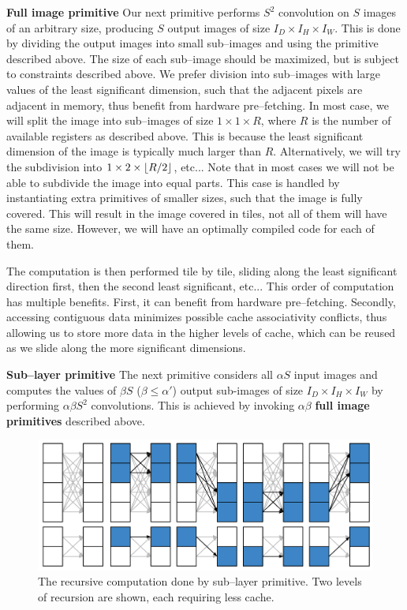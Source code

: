   {\bf Full image primitive} \quad Our next primitive performs $S^2$
  convolution on $S$ images of an arbitrary size, producing $S$ output
  images of size $I_D \times I_H \times I_W$.  This is done by
  dividing the output images into small sub--images and using the
  primitive described above.  The size of each sub--image should be
  maximized, but is subject to constraints described above.  We prefer
  division into sub--images with large values of the least significant
  dimension, such that the adjacent pixels are adjacent in memory,
  thus benefit from hardware pre--fetching.  In most case, we will
  split the image into sub--images of size $1 \times 1 \times R$,
  where $R$ is the number of available registers as described above.
  This is because the least significant dimension of the image is
  typically much larger than $R$.  Alternatively, we will try the
  subdivision into $1 \times 2 \times \lfloor R/2\rfloor$, etc...  Note that
  in most cases we will not be able to subdivide the image into equal
  parts.  This case is handled by instantiating extra primitives of
  smaller sizes, such that the image is fully covered.  This will
  result in the image covered in tiles, not all of them will have the
  same size.  However, we will have an optimally compiled code for
  each of them.

  The computation is then performed tile by tile, sliding along the
  least significant direction first, then the second least
  significant, etc...  This order of computation has multiple
  benefits.  First, it can benefit from hardware pre--fetching.
  Secondly, accessing contiguous data minimizes possible cache
  associativity conflicts, thus allowing us to store more data in the
  higher levels of cache, which can be reused as we slide along the
  more significant dimensions.

  {\bf Sub--layer primitive} \quad The next primitive considers all
  $\alpha S$ input images and computes the values of $\beta S$ ($\beta
  \le \alpha'$) output sub-images of size $I_D \times I_H \times I_W$
  by performing $\alpha \beta S^2$ convolutions.  This is achieved by
  invoking $\alpha \beta$ {\bf full image primitives} described above.

  \begin{figure}
    \begin{center}
      \includegraphics[width=0.8\linewidth]{fig/serialexec}
    \end{center}
    \caption{The recursive computation done by sub--layer primitive.
      Two levels of recursion are shown, each requiring less cache. }
    \label{fig:full-exec}
  \end{figure}

